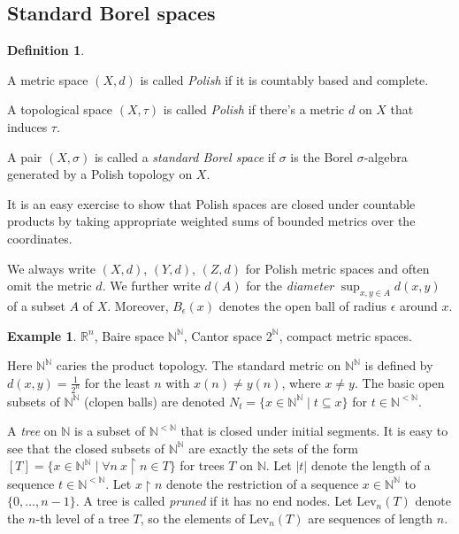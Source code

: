 \documentclass[10pt]{amsart}
\newcommand{\spl}{\mathrm{split}}
\newcommand{\RR}{\mathbb{R}}
\newcommand{\NN}{\mathbb{N}}
\newcommand{\Lev}{\mathrm{Lev}}
\theoremstyle{definition}
\newtheorem{definition}[theorem]{Definition}
\newtheorem{example}[theorem]{Example}
\theoremstyle{remark}
\newenvironment{enumerate-(a)}{\begin{enumerate}[label={\upshape (\alph*)}, leftmargin=2pc]}{\end{enumerate}}
\begin{document}
\subsection{Standard Borel spaces} 

\begin{definition} 
\begin{enumerate-(a)} 
\item 
A metric space $(X,d)$ is called \emph{Polish} if it is countably based and complete. 
\item 
A topological space $(X,\tau)$ is called \emph{Polish} if there's a metric $d$ on $X$ that induces $\tau$. 
\item 
A pair $(X,\sigma)$ is called a \emph{standard Borel space} if $\sigma$ is the Borel $\sigma$-algebra generated by a Polish topology on $X$.  
\end{enumerate-(a)} 
\end{definition} 

It is an easy exercise to show that Polish spaces are closed under countable products by taking appropriate weighted sums of bounded metrics over the coordinates. 

We always write $(X,d)$, $(Y,d)$, $(Z,d)$ for Polish metric spaces and often omit the metric $d$. 
We further write $d(A)$ for the \emph{diameter} $\sup_{x,y\in A} d(x,y)$ of a subset $A$ of $X$. 
Moreover, $B_\epsilon(x)$ denotes the open ball of radius $\epsilon$ around $x$. 

\begin{example} 
$\RR^n$, Baire space $\NN^\NN$,  Cantor space $2^\NN$, compact metric spaces. 
\end{example} 

Here $\NN^\NN$ caries the product topology. 
The standard metric on $\NN^\NN$ is defined by $d(x,y)=\frac{1}{2^n}$ for the least $n$ with $x(n)\neq y(n)$, where $x\neq y$. 
The basic open subsets of $\NN^\NN$ (clopen balls) are denoted $N_t=\{x\in \NN^\NN\mid t\subseteq x\}$ for $t\in \NN^{<\NN}$. 

A \emph{tree} on $\NN$ is a subset of $\NN^{<\NN}$ that is closed under initial segments. 
It is easy to see that the closed subsets of $\NN^\NN$ are exactly the sets of the form $[T]=\{x\in \NN^\NN\mid \forall n\ x{\upharpoonright}n \in T\}$ for trees $T$ on $\NN$. 
Let $|t|$ denote the length of a sequence $t\in \NN^{<\NN}$. 
Let $x{\upharpoonright}n$ denote the restriction of a sequence $x\in \NN^\NN$ to $\{0,\dots,n-1\}$. 
A tree is called \emph{pruned} if it has no end nodes. 
Let $\Lev_n(T)$ denote the $n$-th level of a tree $T$, so the elements of $\Lev_n(T)$ are sequences of length $n$. 
\end{document}
